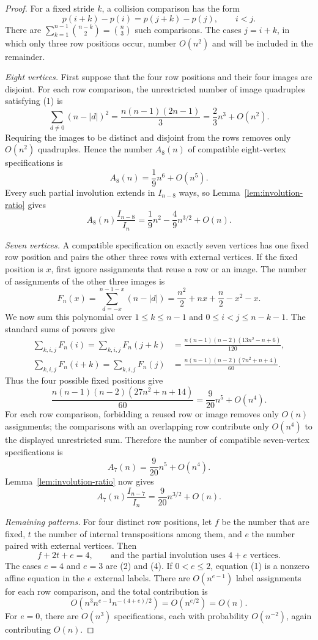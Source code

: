 \documentclass[11pt]{article}
\begin{document}
\begin{proof}
For a fixed stride $k$, a collision comparison has the form
\[
p(i+k)-p(i)=p(j+k)-p(j),\qquad i<j.
\tag{1}
\]
There are
$\sum_{k=1}^{n-1}\binom{n-k}{2}=\binom n3$ such comparisons.  The cases
$j=i+k$, in which only three row positions occur, number $O(n^2)$ and
will be included in the remainder.

\emph{Eight vertices.}
First suppose that the four row positions and their four images are
disjoint.  For each row comparison, the unrestricted number of image
quadruples satisfying (1) is
\[
\sum_{d\ne0}(n-|d|)^2
=\frac{n(n-1)(2n-1)}{3}
=\frac23n^3+O(n^2).
\]
Requiring the images to be distinct and disjoint from the rows removes
only $O(n^2)$ quadruples.  Hence the number $A_8(n)$ of compatible
eight-vertex specifications is
\[
A_8(n)=\frac19n^6+O(n^5).
\]
Every such partial involution extends in $I_{n-8}$ ways, so
Lemma~\ref{lem:involution-ratio} gives
\[
A_8(n)\frac{I_{n-8}}{I_n}
=\frac19n^2-\frac49n^{3/2}+O(n).
\tag{2}
\]

\emph{Seven vertices.}
A compatible specification on exactly seven vertices has one fixed row
position and pairs the other three rows with external vertices.  If the
fixed position is $x$, first ignore assignments that reuse a row or an
image.  The number of assignments of the other three images is
\[
F_n(x)=\sum_{d=-x}^{n-1-x}(n-|d|)
=\frac{n^2}{2}+nx+\frac n2-x^2-x.
\tag{3}
\]
We now sum this polynomial over
$1\leq k\leq n-1$ and $0\leq i<j\leq n-k-1$.  The standard sums of
powers give
\begin{align*}
\sum_{k,i,j}F_n(i)
=\sum_{k,i,j}F_n(j+k)
&=\frac{n(n-1)(n-2)(13n^2-n+6)}{120},\\
\sum_{k,i,j}F_n(i+k)
=\sum_{k,i,j}F_n(j)
&=\frac{n(n-1)(n-2)(7n^2+n+4)}{60}.
\end{align*}
Thus the four possible fixed positions give
\[
\frac{n(n-1)(n-2)(27n^2+n+14)}{60}
=\frac9{20}n^5+O(n^4).
\]
For each row comparison, forbidding a reused row or image removes only
$O(n)$ assignments; the comparisons with an overlapping row contribute
only $O(n^4)$ to the displayed unrestricted sum.  Therefore the number
of compatible seven-vertex specifications is
\[
A_7(n)=\frac9{20}n^5+O(n^4).
\]
Lemma~\ref{lem:involution-ratio} now gives
\[
A_7(n)\frac{I_{n-7}}{I_n}
=\frac9{20}n^{3/2}+O(n).
\tag{4}
\]

\emph{Remaining patterns.}
For four distinct row positions, let $f$ be the number that are fixed,
$t$ the number of internal transpositions among them, and $e$ the number
paired with external vertices.  Then
\[
f+2t+e=4,
\qquad\text{and the partial involution uses }4+e\text{ vertices}.
\]
The cases $e=4$ and $e=3$ are (2) and (4).  If $0<e\leq2$, equation (1)
is a nonzero affine equation in the $e$ external labels.  There are
$O(n^{e-1})$ label assignments for each row comparison, and the total
contribution is
\[
O\!\left(n^3 n^{e-1} n^{-(4+e)/2}\right)=O(n^{e/2})=O(n).
\]
For $e=0$, there are $O(n^3)$ specifications, each with probability
$O(n^{-2})$, again contributing $O(n)$.


\end{proof}
\end{document}
